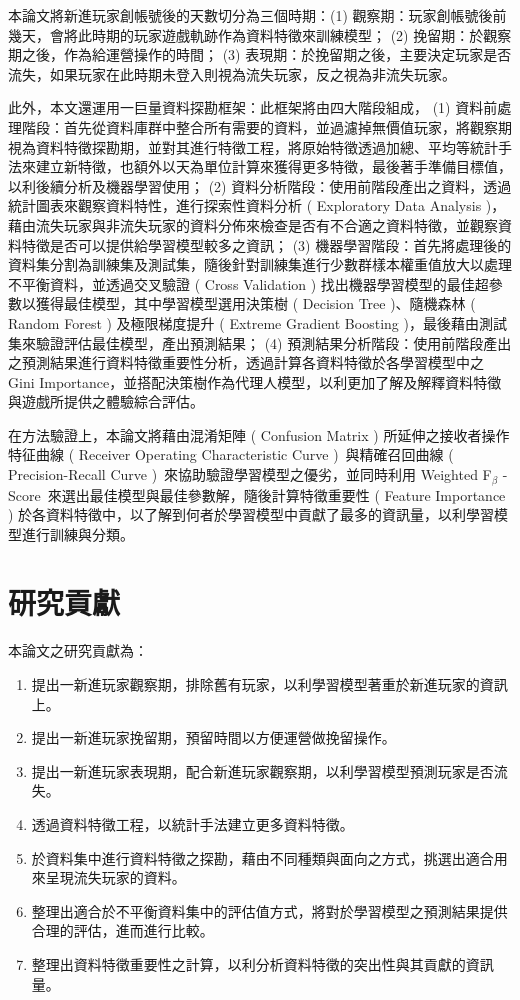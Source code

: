 本論文將新進玩家創帳號後的天數切分為三個時期：(1) 觀察期：玩家創帳號後前幾天，會將此時期的玩家遊戲軌跡作為資料特徵來訓練模型； (2) 挽留期：於觀察期之後，作為給運營操作的時間； (3) 表現期：於挽留期之後，主要決定玩家是否流失，如果玩家在此時期未登入則視為流失玩家，反之視為非流失玩家。

此外，本文還運用一巨量資料探勘框架：此框架將由四大階段組成， (1) 資料前處理階段：首先從資料庫群中整合所有需要的資料，並過濾掉無價值玩家，將觀察期視為資料特徵探勘期，並對其進行特徵工程，將原始特徵透過加總、平均等統計手法來建立新特徵，也額外以天為單位計算來獲得更多特徵，最後著手準備目標值，以利後續分析及機器學習使用； (2) 資料分析階段：使用前階段產出之資料，透過統計圖表來觀察資料特性，進行探索性資料分析 ( Exploratory Data Analysis )，藉由流失玩家與非流失玩家的資料分佈來檢查是否有不合適之資料特徵，並觀察資料特徵是否可以提供給學習模型較多之資訊； (3) 機器學習階段：首先將處理後的資料集分割為訓練集及測試集，隨後針對訓練集進行少數群樣本權重值放大以處理不平衡資料，並透過交叉驗證 ( Cross Validation ) 找出機器學習模型的最佳超參數以獲得最佳模型，其中學習模型選用決策樹 ( Decision Tree )、隨機森林 ( Random Forest ) 及極限梯度提升 ( Extreme Gradient Boosting )，最後藉由測試集來驗證評估最佳模型，產出預測結果； (4) 預測結果分析階段：使用前階段產出之預測結果進行資料特徵重要性分析，透過計算各資料特徵於各學習模型中之 Gini Importance，並搭配決策樹作為代理人模型，以利更加了解及解釋資料特徵與遊戲所提供之體驗綜合評估。

在方法驗證上，本論文將藉由混淆矩陣 ( Confusion Matrix ) 所延伸之接收者操作特征曲線 ( Receiver Operating Characteristic Curve )~\cite{fawcett2006introduction}與精確召回曲線 ( Precision-Recall Curve )~\cite{article}來協助驗證學習模型之優劣，並同時利用 Weighted F$_{\beta}$ - Score~\cite{Goutte2005API}來選出最佳模型與最佳參數解，隨後計算特徵重要性 ( Feature Importance ) 於各資料特徵中，以了解到何者於學習模型中貢獻了最多的資訊量，以利學習模型進行訓練與分類。
\newpage

\section{研究貢獻}

本論文之研究貢獻為：

\begin{enumerate}
    \item 提出一新進玩家觀察期，排除舊有玩家，以利學習模型著重於新進玩家的資訊上。
    \item 提出一新進玩家挽留期，預留時間以方便運營做挽留操作。
    \item 提出一新進玩家表現期，配合新進玩家觀察期，以利學習模型預測玩家是否流失。
    \item 透過資料特徵工程，以統計手法建立更多資料特徵。
    \item 於資料集中進行資料特徵之探勘，藉由不同種類與面向之方式，挑選出適合用來呈現流失玩家的資料。
    \item 整理出適合於不平衡資料集中的評估值方式，將對於學習模型之預測結果提供合理的評估，進而進行比較。
    \item 整理出資料特徵重要性之計算，以利分析資料特徵的突出性與其貢獻的資訊量。
\end{enumerate}

